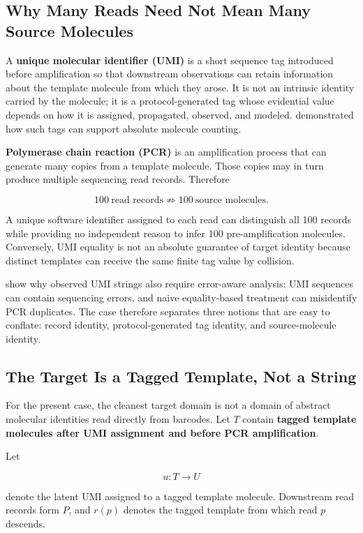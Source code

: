 \documentclass[12pt]{article}
\begin{document}
\subsection{Why Many Reads Need Not Mean Many Source Molecules}

A \textbf{unique molecular identifier (UMI)} is a short sequence tag introduced before amplification so that downstream observations can retain information about the template molecule from which they arose. It is not an intrinsic identity carried by the molecule; it is a protocol-generated tag whose evidential value depends on how it is assigned, propagated, observed, and modeled. \citet{Kivioja2012UMI} demonstrated how such tags can support absolute molecule counting.

\textbf{Polymerase chain reaction (PCR)} is an amplification process that can generate many copies from a template molecule. Those copies may in turn produce multiple sequencing read records. Therefore

\[
100\ \text{read records}
\not\Rightarrow
100\ \text{source molecules}.
\]

A unique software identifier assigned to each read can distinguish all 100 records while providing no independent reason to infer 100 pre-amplification molecules. Conversely, UMI equality is not an absolute guarantee of target identity because distinct templates can receive the same finite tag value by collision.

\citet{SmithHegerSudbery2017UMITools} show why observed UMI strings also require error-aware analysis: UMI sequences can contain sequencing errors, and naive equality-based treatment can misidentify PCR duplicates. The case therefore separates three notions that are easy to conflate: record identity, protocol-generated tag identity, and source-molecule identity.

\subsection{The Target Is a Tagged Template, Not a String}

For the present case, the cleanest target domain is not a domain of abstract molecular identities read directly from barcodes. Let \(T\) contain \textbf{tagged template molecules after UMI assignment and before PCR amplification}.

Let

\[
u:T\to U
\]

denote the latent UMI assigned to a tagged template molecule. Downstream read records form \(P\), and \(r(p)\) denotes the tagged template from which read \(p\) descends.
\end{document}
